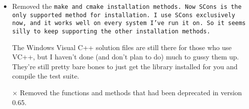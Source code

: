 \begin{itemize}
\item
Removed the \tt{make} and \tt{cmake} installation methods.  
Now SCons is the 
only supported method for installation.  I use SCons exclusively now, 
and it works well on every system I've run it on.  So it seems silly
to keep supporting the other installation methods.  

The Windows Visual C++ solution files are still there for those who use VC++,
but I haven't done (and don't plan to do) much to gussy them up.  They're
still pretty bare bones to just get the library installed for you and
compile the test suite.

\item[$\times$]
Removed the functions and methods that had been deprecated in version 0.65.


\end{itemize}
